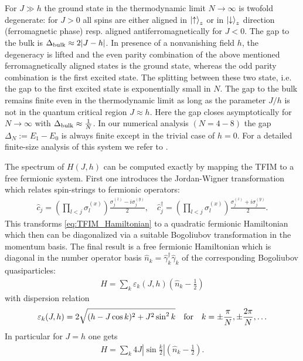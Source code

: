 \documentclass[12pt,a4paper]{article}
\let\varepsilon\varepsilon
\begin{document}
For $J\gg h$ the ground state in the thermodynamic limit $N\to\infty$ is twofold degenerate: for $J>0$ all spins are either aligned in $\ket{\uparrow}_z$ %
or in $\ket{\downarrow}_z$ direction (ferromagnetic phase) resp. aligned antiferromagnetically %
for $J<0$. The gap to the bulk is $\Delta_{\rm bulk}\approx 2 |J-h|$. In presence of a nonvanishing field $h$, the degeneracy is lifted and the even parity combination of the above mentioned ferromagnetically aligned states is the ground state, whereas the odd parity combination is the first excited state. The splitting between these two state, i.e. the gap to the first excited state is exponentially small in $N$. The gap to the bulk remains finite even in the thermodynamic limit as long as the parameter $J/h$ is not in %
the quantum critical region $J\approx h$. Here the gap closes asymptotically for $N\to \infty$ with $\Delta_{\rm bulk} \approx \frac1N$. 
In our numerical analysis $(N=4-8)$ the gap $\Delta_N:= E_1-E_0$ is always finite except in the trivial case of $h=0$. For a detailed finite-size analysis of this system we refer to \citet{oshikawa2019}.


The spectrum of $H(J,h)$ can be computed exactly by mapping the TFIM to a free fermionic system. First one introduces the Jordan-Wigner transformation which relates spin-strings to fermionic operators:
\begin{align}\label{eq:JW-trafo}
\hat{c}_j = \left(\prod_{l<j} \sigma^{(x)}_{l} \right) \frac{\sigma^{(z)}_{j}-i\sigma^{(y)}_{j}}{2}, \quad \hat{c}_j^{\dagger} = \left(\prod_{l<j} \sigma^{(x)}_{l} \right) \frac{\sigma^{(z)}_{j}+i\sigma^{(y)}_{j}}{2}.
\end{align}
This transforms \cref{eq:TFIM_Hamiltonian} to a quadratic fermionic Hamiltonian which then can be diagonalized via a suitable Bogoliubov transformation in the momentum basis. The final result is a free fermionic Hamiltonian which is diagonal in the number operator basis $\hat{n}_k= \hat{\gamma}_k^{\dagger} \hat{\gamma}_k$ of the corresponding Bogoliubov quasiparticles:
\begin{align}\label{eq:TFIM_ff}
    H = \sum_k \varepsilon_k (J,h)\left( \hat{n}_k - \frac12\right)
\end{align}
with dispersion relation
\begin{align}\label{eq:TFIM_dispersion}
   \varepsilon_k(J,h) = 2\sqrt{(h-J\cos k)^2 + J^2\sin^2 k} \quad {\rm for} \quad k = \pm \frac{\pi}{N}, \pm \frac{2\pi}{N}, \ldots
\end{align}
In particular for $J=h$ one gets
\begin{align}\label{eq:H_critical}
    H = \sum_k 4J | \sin \tfrac{k}{2}| \left( \hat{n}_k - \tfrac12\right).
\end{align}
\end{document}

